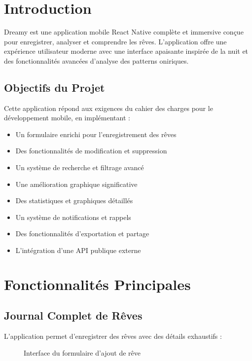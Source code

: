 \documentclass[12pt,a4paper]{article}
\begin{document}
\section{Introduction}

Dreamy est une application mobile React Native complète et immersive conçue pour enregistrer, analyser et comprendre les rêves. L'application offre une expérience utilisateur moderne avec une interface apaisante inspirée de la nuit et des fonctionnalités avancées d'analyse des patterns oniriques.

\subsection{Objectifs du Projet}

Cette application répond aux exigences du cahier des charges pour le développement mobile, en implémentant :
\begin{itemize}
    \item Un formulaire enrichi pour l'enregistrement des rêves
    \item Des fonctionnalités de modification et suppression
    \item Un système de recherche et filtrage avancé
    \item Une amélioration graphique significative
    \item Des statistiques et graphiques détaillés
    \item Un système de notifications et rappels
    \item Des fonctionnalités d'exportation et partage
    \item L'intégration d'une API publique externe
\end{itemize}

\section{Fonctionnalités Principales}

\subsection{Journal Complet de Rêves}

L'application permet d'enregistrer des rêves avec des détails exhaustifs :

\begin{figure}[H]
    \centering
    \caption{Interface du formulaire d'ajout de rêve}
\end{figure}
\end{document}
